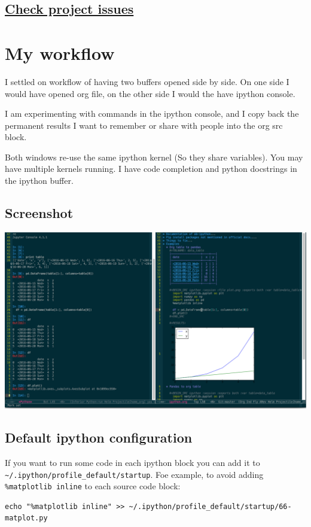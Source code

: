 \documentclass[11pt]{article}
\begin{document}
\subsection{\href{https://github.com/gregsexton/ob-ipython/issues}{Check project issues}}
\label{sec:orgheadline37}
\section{My workflow}
\label{sec:orgheadline41}
I settled on workflow of having two buffers opened side by side.
On one side I would have opened org file, on the other side I would the have ipython console.

I am experimenting with commands in the ipython console, and I copy back the permanent results I want to
remember or share with people into the org src block.

Both windows re-use the same ipython kernel (So they share variables). You may have multiple kernels running.
I have code completion and python docstrings in the ipython buffer.
\subsection{Screenshot}
\label{sec:orgheadline2}
\includegraphics[width=.9\linewidth]{ob-ipython.png}
\subsection{Default ipython configuration}
\label{sec:orgheadline39}
If you want to run some code in each ipython block you can add it to \texttt{\textasciitilde{}/.ipython/profile\_default/startup}.
Foe example, to avoid adding \texttt{\%matplotlib inline} to each source code block:
\begin{verbatim}
echo "%matplotlib inline" >> ~/.ipython/profile_default/startup/66-matplot.py
\end{verbatim}
\end{document}

